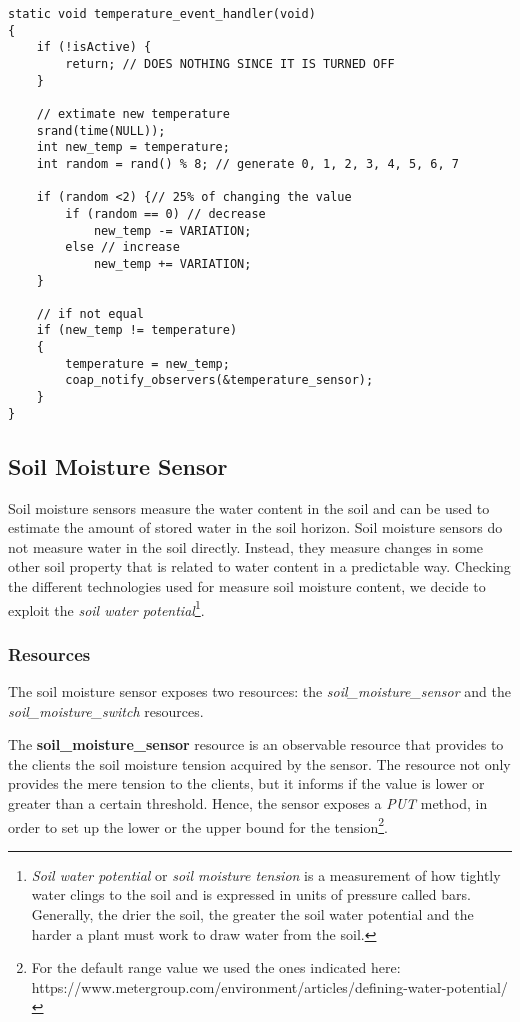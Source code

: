\begin{lstlisting}
static void temperature_event_handler(void)
{
    if (!isActive) {
        return; // DOES NOTHING SINCE IT IS TURNED OFF
    }
    
    // extimate new temperature
    srand(time(NULL));
    int new_temp = temperature;
    int random = rand() % 8; // generate 0, 1, 2, 3, 4, 5, 6, 7
    
    if (random <2) {// 25% of changing the value
        if (random == 0) // decrease
            new_temp -= VARIATION;
        else // increase
            new_temp += VARIATION;
    }

    // if not equal
    if (new_temp != temperature)
    {
        temperature = new_temp;
        coap_notify_observers(&temperature_sensor);
    }
}
\end{lstlisting}



\subsection{Soil Moisture Sensor}
Soil moisture sensors measure the water content in the soil and can be used to estimate the amount of stored water in the soil horizon. Soil moisture sensors do not measure water in the soil directly. Instead, they measure changes in some other soil property that is related to water content in a predictable way. Checking the different technologies used for measure soil moisture content, we decide to exploit the \textit{soil water potential}\footnote{\textit{Soil water potential} or \textit{soil moisture tension} is a measurement of how tightly water clings to the soil and is expressed in units of pressure called bars. Generally, the drier the soil, the greater the soil water potential and the harder a plant must work to draw water from the soil.}.

\subsubsection{Resources}
The soil moisture sensor exposes two resources: the \textit{soil\_moisture\_sensor} and the \textit{soil\_moisture\_switch} resources.

The \textbf{soil\_moisture\_sensor} resource is an observable resource that provides to the clients the soil moisture tension acquired by the sensor. The resource not only provides the mere tension to the clients, but it informs if the value is lower or greater than a certain threshold. Hence, the sensor exposes a  \textit{PUT} method, in order to set up the lower or the upper bound for the tension\footnote{For the default range value we used the ones indicated here: https://www.metergroup.com/environment/articles/defining-water-potential/ }.

